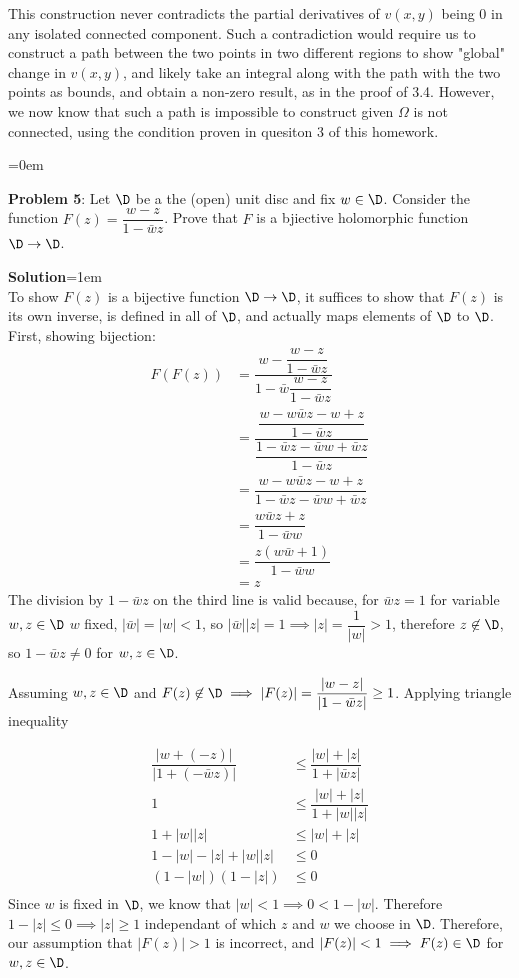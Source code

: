 \documentclass{article}
\begin{document}
This construction never contradicts the partial derivatives of $v(x, y)$ being 0 in any isolated connected component. Such a contradiction would require us to construct a path between the two points in two different regions to show "global" change in $v(x, y)$, and likely take an integral along with the path with the two points as bounds, and obtain a non-zero result, as in the proof of 3.4. However, we now know that such a path is impossible to construct given $\Omega$ is not connected, using the condition proven in quesiton 3 of this homework.

\newpage\parskip=0em
\begin{mdframed}[backgroundcolor=blue!20]
\textbf{Problem 5}: Let $\D$ be a the (open) unit disc and fix $w \in \D$. Consider the function $F(z) = \dfrac{w-z}{1-\bar{w}z}$. Prove that $F$ is a bjiective holomorphic function $\D \to \D$. 
\end{mdframed}
\textbf{Solution}\parskip=1em\\
To show $F(z)$ is a bijective function $\D \to \D$, it suffices to show that $F(z)$ is its own inverse, is defined in all of $\D$, and actually maps elements of $\D$ to $\D$. First, showing bijection:
\begin{align*}
    F(F(z)) &= \dfrac{w-\dfrac{w-z}{1-\bar{w}z}}{1-\bar{w}\dfrac{w-z}{1-\bar{w}z}}\\
    &= \dfrac{\dfrac{w-w\bar{w}z -w+z}{1-\bar{w}z}}{\dfrac{1-\bar{w}z-\bar{w}w+\bar{w}z}{1-\bar{w}z}}\\
    &= \dfrac{w-w\bar{w}z -w+z}{1-\bar{w}z-\bar{w}w+\bar{w}z}\\
    &= \dfrac{w\bar{w}z+z}{1-\bar{w}w}\\
    &= \dfrac{z(w\bar{w}+1)}{1-\bar{w}w}\\
    &= z
\end{align*}
The division by $1-\bar{w}z$ on the third line is valid because, for $\bar{w}z = 1$ for variable $w, z\in \D$ $w$ fixed, $|\bar{w}| = |w|< 1$, so $|\bar{w}||z| = 1 \implies |z| = \dfrac{1}{|w|} > 1$, therefore $z \not\in \D$, so $1 -\bar{w}{z} \neq 0$ for $w, z \in \D$. 

Assuming $w, z \in \D$ and $F(z) \not \in \D \implies |F(z)| = \dfrac{|w-z|}{|1-\bar{w}z|} \geq 1$. Applying triangle inequality

\begin{align*}
    \dfrac{\left|w+(-z)\right|}{\left|1+(-\bar{w}z)\right|} &\leq \dfrac{|w|+|z|}{1+|\bar{w}z|}\\
    1 &\leq \dfrac{|w|+|z|}{1+|w||z|}\\
    1+|w||z| &\leq |w|+|z|\\
    1 - |w| - |z| + |w||z| &\leq 0\\
    (1 - |w|)(1 - |z|) &\leq 0\\
\end{align*}
Since $w$ is fixed in $\D$, we know that $|w| < 1 \implies 0 < 1 - |w|$. Therefore $1-|z| \leq 0 \implies |z| \geq 1$ independant of which $z$ and $w$ we choose in $\D$. Therefore, our assumption that $|F(z)| > 1$ is incorrect, and $|F(z)| < 1 \implies F(z) \in \D$ for $w, z \in \D$.
\end{document}
